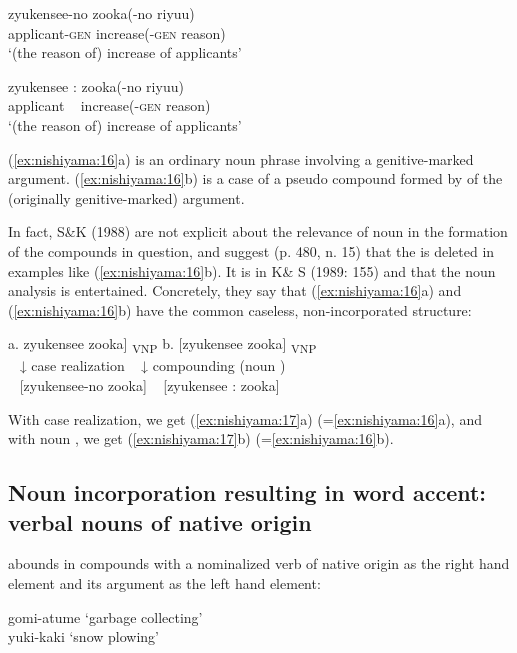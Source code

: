 \documentclass[output=paper]{LSP/langsci}
\begin{document}
\ea\label{ex:nishiyama:16}
 \ea
 \gll zyukensee-no  zooka(-no riyuu)\\
    applicant-\textsc{gen}  increase(-\textsc{gen} reason)\\
\glt ‘(the reason of) increase of applicants’

  \ex
  \gll zyukensee : zooka(-no riyuu)\\
    applicant ~ increase(-\textsc{gen} reason)\\
\glt ‘(the reason of) increase of applicants’
\z \z

(\ref{ex:nishiyama:16}a) is an ordinary noun phrase involving a genitive-marked argument. (\ref{ex:nishiyama:16}b) is a case of a pseudo compound formed by  of the (originally geni\-tive-marked) argument.

In fact, S\&K (1988) are not explicit about the relevance of noun  in the formation of the compounds in question, and suggest (p. 480, n. 15) that the  is deleted in examples like (\ref{ex:nishiyama:16}b). It is in K\& S (1989: 155) and \citet[236]{Kageyama1993} that the noun  analysis is entertained. Concretely, they say that (\ref{ex:nishiyama:16}a) and (\ref{ex:nishiyama:16}b) have the common caseless, non-incorporated structure:

\ea\label{ex:nishiyama:17}
 \glll a. {{\ob}zyukensee  zooka] \textsubscript{VNP}} b.  {[zyukensee  zooka] \textsubscript{VNP}}\\
      ~ {↓ case realization}                         ~  {↓ compounding (noun )}\\
     ~ {[zyukensee-no  zooka]} ~   {[zyukensee : zooka]}\\
\z

With case realization, we get (\ref{ex:nishiyama:17}a) (=\ref{ex:nishiyama:16}a), and with noun , we get (\ref{ex:nishiyama:17}b) (=\ref{ex:nishiyama:16}b).

\subsection{Noun incorporation resulting in word accent: verbal nouns of native origin}\label{sec:nishiyama:3.2}
 

 abounds in compounds with a nominalized verb of native origin as the right hand element and its argument as the left hand element:

\ea\label{ex:nishiyama:18}
   gomi-atume ‘garbage collecting’ \\   yuki-kaki ‘snow plowing’
\z
\end{document}
